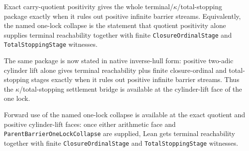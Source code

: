 \begin{theorem}
  \label{thm:collatz-two-adic-carry-quotient-kappa-package}
  \leanok
  Exact carry-quotient positivity gives the whole terminal/\(\kappa\)/total-stopping
  package exactly when it rules out positive infinite barrier streams. Equivalently,
  the named one-lock collapse is the statement that quotient positivity alone
  supplies terminal reachability together with finite \texttt{ClosureOrdinalStage}
  and \texttt{TotalStoppingStage} witnesses.
\end{theorem}
\begin{theorem}
  \label{thm:collatz-two-adic-cylinder-lift-kappa-package}
  \leanok
  The same package is now stated in native inverse-hull form: positive
  two-adic cylinder lift alone gives terminal reachability plus finite
  closure-ordinal and total-stopping stages exactly when it rules out positive
  infinite barrier streams. Thus the \(\kappa\)/total-stopping settlement bridge
  is available at the cylinder-lift face of the one lock.
\end{theorem}
\begin{theorem}
  \label{thm:collatz-two-adic-cylinder-lift-kappa-package-forward}
  \leanok
  Forward use of the named one-lock collapse is available at the exact quotient
  and positive cylinder-lift faces: once either arithmetic face and
  \texttt{ParentBarrierOneLockCollapse} are supplied, Lean gets terminal
  reachability together with finite \texttt{ClosureOrdinalStage} and
  \texttt{TotalStoppingStage} witnesses.
\end{theorem}
